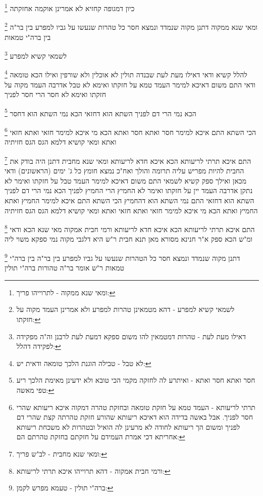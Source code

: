 \documentclass[12pt, openany]{book}
\newcommand{\footnotecomment}[1]{
	\renewcommand\thefootnote{}
	\footnote{#1}}
\newcommand{\commenta}[1]{\footnotecomment{#1}}
\begin{document}
{{\commenta{ומאי שנא ממקוה - לתרוייהו פריך:}
כיון דמגופה קחזיא לא אמרינן אוקמה אחזקתה 
\commenta{לשמאי קשיא למפרע - דהא מטמאינן טהרות למפרע ולא אמרינן העמד מקוה על חזקתו:}
ומאי שנא ממקוה דתנן מקוה שנמדד ונמצא חסר כל טהרות שנעשו על גביו למפרע בין בר"ה בין ברה"י טמאות 
\commenta{דאילו מעת לעת - טהרות דמטמאין להו משום ספקא דמעת לעת לרבנן וה"ה מפקידה לפקידה דהלל:}
לשמאי קשיא למפרע 
\commenta{לא טבל - טבילה הוגנת הלכך טומאה ודאית יש:}
להלל קשיא ודאי דאילו מעת לעת שבנדה תולין לא אוכלין ולא שורפין ואילו הכא טומאה ודאי 
התם משום דאיכא למימר העמד טמא על חזקתו ואימא לא טבל אדרבה העמד מקוה על חזקתו ואימא לא חסר הרי חסר לפניך 
\commenta{חסר ואתא חסר ואתא - ואיתרע לה לחזקה מקמי הכי טובא ולא ידעינן מאימת הלכך ריע טפי מאשה:}
הכא נמי הרי דם לפניך השתא הוא דחזאי הכא נמי השתא הוא דחסר 
\commenta{תרתי לריעותא - העמד טמא על חזקת טומאה ובחזקת טהרה דמקוה איכא ריעותא שהרי חסר לפניך. אבל באשה בדידה הוא דאיכא ריעותא שהורע חזקת טהרתה קצת שהרי דם לפניך ומשום הך ריעותא לחודה לא מרעינן לה הואיל ובטהרות לא משכחת ריעותא אחריתא דכי אמרת העמידם על חזקתם בחזקת טהרתם הם:}
הכי השתא התם איכא למימר חסר ואתא חסר ואתא הכא מי איכא למימר חזאי ואתא חזאי ואתא ומאי קושיא דלמא הגס הגס חזיתיה 
\commenta{ומאי שנא מחבית - לב"ש פריך:}
התם איכא תרתי לריעותא הכא איכא חדא לריעותא 
ומאי שנא מחבית דתנן היה בודק את החבית להיות מפריש עליה תרומה והולך ואח"כ נמצא חומץ כל ג' ימים (הראשונים) ודאי
מכאן ואילך ספק קשיא לשמאי 
התם משום דאיכא למימר העמד טבל על חזקתו ואימר לא נתקן אדרבה העמד יין על חזקתו ואימר לא החמיץ 
הרי החמיץ לפניך הכא נמי הרי דם לפניך השתא הוא דחזאי התם נמי השתא הוא דהחמיץ 
הכי השתא התם איכא למימר החמיץ ואתא החמיץ ואתא הכא מי איכא למימר חזאי ואתא חזאי ואתא ומאי קושיא דלמא הגס הגס חזיתיה 
\commenta{ורמי חבית אמקוה - דהא תרוייהו איכא תרתי לריעותא:}
התם איכא תרתי לריעותא הכא איכא חדא לריעותא 
ורמי חבית אמקוה מאי שנא הכא ודאי ומ"ש הכא ספק 
א"ר חנינא מסורא מאן תנא חבית ר"ש היא דלגבי מקוה נמי ספקא משוי ליה 
\commenta{ברה"י תולין - טעמא מפרש לקמן:}
דתנן מקוה שנמדד ונמצא חסר כל הטהרות שנעשו על גביו למפרע בין בר"ה בין ברה"י טמאות 
ר"ש אומר בר"ה טהורות ברה"י תולין
\clearpage}

}
\end{document}

